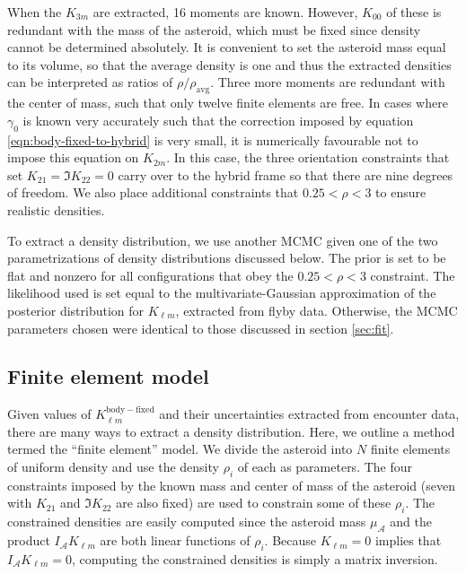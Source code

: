 \documentclass[fleqn,usenatbib]{mnras}
\begin{document}
When the $K_{3m}$ are extracted, 16 moments are known. However, $K_{00}$ of these is redundant with the mass of the asteroid, which must be fixed since density cannot be determined absolutely. It is convenient to set the asteroid mass equal to its volume, so that the average density is one and thus the extracted densities can be interpreted as ratios of $\rho / \rho_\text{avg}$. Three more moments are redundant with the center of mass, such that only twelve finite elements are free. In cases where $\gamma_0$ is known very accurately such that the correction imposed by equation \ref{eqn:body-fixed-to-hybrid} is very small, it is numerically favourable not to impose this equation on $K_{2m}$. In this case, the three orientation constraints that set $K_{21}=\Im K_{22} = 0$ carry over to the hybrid frame so that there are nine degrees of freedom. We also place additional constraints that $0.25 < \rho < 3$ to ensure realistic densities.

To extract a density distribution, we use another MCMC given one of the two parametrizations of density distributions discussed below. The prior is set to be flat and nonzero for all configurations that obey the $0.25 < \rho < 3$ constraint. The likelihood used is set equal to the multivariate-Gaussian approximation of the posterior distribution for $K_{\ell m}$, extracted from flyby data. Otherwise, the MCMC parameters chosen were identical to those discussed in section \ref{sec:fit}.



\subsection{Finite element model}

Given values of $K_{\ell m}^\mathrm{body-fixed}$ and their uncertainties extracted from encounter data, there are many ways to extract a density distribution. Here, we outline a method termed the ``finite element'' model. We divide the asteroid into $N$ finite elements of uniform density and use the density $\rho_i$ of each as parameters. The four constraints imposed by the known mass and center of mass of the asteroid (seven with $K_{21}$ and $\Im K_{22}$ are also fixed) are used to constrain some of these $\rho_i$. The constrained densities are easily computed since the asteroid mass $\mu_\mathcal{A}$ and the product $I_\mathcal{A}K_{\ell m}$ are both linear functions of $\rho_i$. Because $K_{\ell m} = 0$ implies that $I_\mathcal{A}K_{\ell m} = 0$, computing the constrained densities is simply a matrix inversion.
\end{document}
